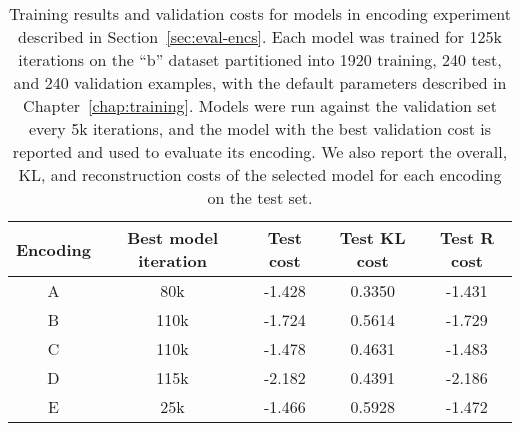 \begin{table}
\centering
    \caption[Training results for models in encoding experiment]{Training results  and validation costs for models in encoding experiment described in Section~\ref{sec:eval-encs}.
    Each model was trained for 125k iterations on the ``b'' dataset partitioned into 1920 training, 240 test, and 240 validation examples, with the default parameters described in Chapter~\ref{chap:training}.
    Models were run against the validation set every 5k iterations, and the model with the best validation cost is reported and used to evaluate its encoding.
    We also report the overall, KL, and reconstruction costs of the selected model for each encoding on the test set.
    \label{apptbl:train-encs}}
\begin{tabular}{c c c c c}
\toprule
    Encoding & Best model iteration & Test cost & Test KL cost & Test R cost \\ \midrule
    A & 80k & -1.428 & 0.3350 & -1.431 \\
    B & 110k & -1.724 & 0.5614 & -1.729 \\
    C & 110k & -1.478 & 0.4631 & -1.483 \\
    D & 115k & -2.182 & 0.4391 & -2.186 \\
    E & 25k & -1.466 & 0.5928 &  -1.472
\end{tabular}
\end{table}

